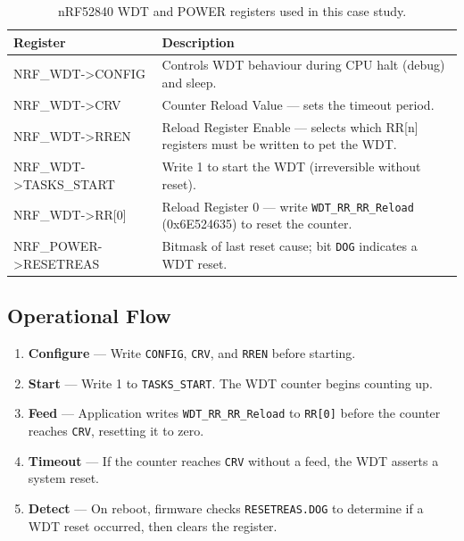 \documentclass[12pt, a4paper]{article}
\begin{document}
\begin{table}[h!]
  \centering
  \begin{tabular}{>{\ttfamily}l p{9cm}}
    \toprule
    \textrm{Register}           & Description \\
    \midrule
    NRF\_WDT->CONFIG            & Controls WDT behaviour during CPU halt
                                  (debug) and sleep. \\
    NRF\_WDT->CRV               & Counter Reload Value — sets the timeout
                                  period. \\
    NRF\_WDT->RREN              & Reload Register Enable — selects which
                                  RR[n] registers must be written to pet
                                  the WDT. \\
    NRF\_WDT->TASKS\_START      & Write 1 to start the WDT (irreversible
                                  without reset). \\
    NRF\_WDT->RR[0]             & Reload Register 0 — write
                                  \texttt{WDT\_RR\_RR\_Reload} (0x6E524635)
                                  to reset the counter. \\
    NRF\_POWER->RESETREAS       & Bitmask of last reset cause; bit
                                  \texttt{DOG} indicates a WDT reset. \\
    \bottomrule
  \end{tabular}
  \caption{nRF52840 WDT and POWER registers used in this case study.}
\end{table}

\subsection{Operational Flow}

\begin{enumerate}[label=\arabic*.]
  \item \textbf{Configure} --- Write \texttt{CONFIG}, \texttt{CRV}, and
        \texttt{RREN} before starting.
  \item \textbf{Start} --- Write 1 to \texttt{TASKS\_START}. The WDT
        counter begins counting up.
  \item \textbf{Feed} --- Application writes \texttt{WDT\_RR\_RR\_Reload} to
        \texttt{RR[0]} before the counter reaches \texttt{CRV}, resetting it
        to zero.
  \item \textbf{Timeout} --- If the counter reaches \texttt{CRV} without a
        feed, the WDT asserts a system reset.
  \item \textbf{Detect} --- On reboot, firmware checks \texttt{RESETREAS.DOG}
        to determine if a WDT reset occurred, then clears the register.
\end{enumerate}
\end{document}
